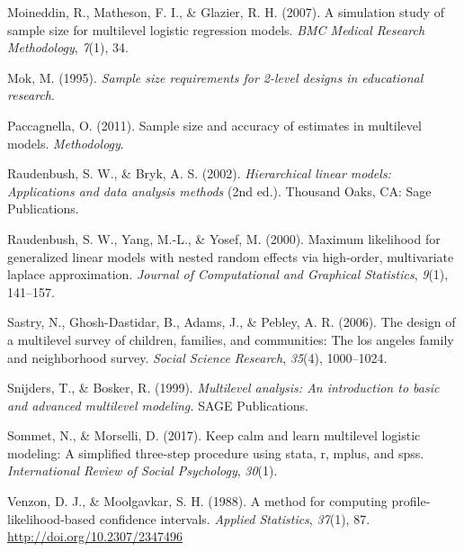 \documentclass[12pt,oneside,a4paper]{reedthesis}
\begin{document}
\leavevmode\hypertarget{ref-moineddin2007simulation}{}%
Moineddin, R., Matheson, F. I., \& Glazier, R. H. (2007). A simulation study of sample size for multilevel logistic regression models. \emph{BMC Medical Research Methodology}, \emph{7}(1), 34.

\leavevmode\hypertarget{ref-mok95}{}%
Mok, M. (1995). \emph{Sample size requirements for 2-level designs in educational research}.

\leavevmode\hypertarget{ref-paccagnella2011sample}{}%
Paccagnella, O. (2011). Sample size and accuracy of estimates in multilevel models. \emph{Methodology}.

\leavevmode\hypertarget{ref-raud2002}{}%
Raudenbush, S. W., \& Bryk, A. S. (2002). \emph{Hierarchical linear models: Applications and data analysis methods} (2nd ed.). Thousand Oaks, CA: Sage Publications.

\leavevmode\hypertarget{ref-raudenbush2000maximum}{}%
Raudenbush, S. W., Yang, M.-L., \& Yosef, M. (2000). Maximum likelihood for generalized linear models with nested random effects via high-order, multivariate laplace approximation. \emph{Journal of Computational and Graphical Statistics}, \emph{9}(1), 141--157.

\leavevmode\hypertarget{ref-sastry2006design}{}%
Sastry, N., Ghosh-Dastidar, B., Adams, J., \& Pebley, A. R. (2006). The design of a multilevel survey of children, families, and communities: The los angeles family and neighborhood survey. \emph{Social Science Research}, \emph{35}(4), 1000--1024.

\leavevmode\hypertarget{ref-snijders1999multilevel}{}%
Snijders, T., \& Bosker, R. (1999). \emph{Multilevel analysis: An introduction to basic and advanced multilevel modeling.} SAGE Publications.

\leavevmode\hypertarget{ref-sommet2017keep}{}%
Sommet, N., \& Morselli, D. (2017). Keep calm and learn multilevel logistic modeling: A simplified three-step procedure using stata, r, mplus, and spss. \emph{International Review of Social Psychology}, \emph{30}(1).

\leavevmode\hypertarget{ref-venzon1988}{}%
Venzon, D. J., \& Moolgavkar, S. H. (1988). A method for computing profile-likelihood-based confidence intervals. \emph{Applied Statistics}, \emph{37}(1), 87. \url{http://doi.org/10.2307/2347496}


\end{document}
